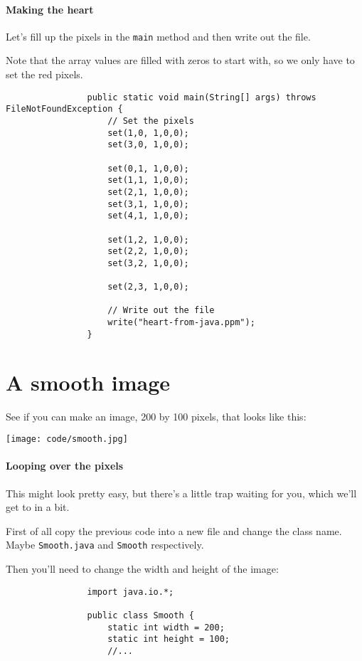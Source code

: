 \documentclass{article}
\begin{document}
        \paragraph{Making the heart}
            Let's fill up the pixels in the \texttt{main} method and then write out the file.
            
            Note that the array values are filled with zeros to start with, so we only have to set the red pixels.
            
            \begin{verbatim}
                public static void main(String[] args) throws FileNotFoundException {
                    // Set the pixels
                    set(1,0, 1,0,0);
                    set(3,0, 1,0,0);
                    
                    set(0,1, 1,0,0);
                    set(1,1, 1,0,0);
                    set(2,1, 1,0,0);
                    set(3,1, 1,0,0);
                    set(4,1, 1,0,0);
                    
                    set(1,2, 1,0,0);
                    set(2,2, 1,0,0);
                    set(3,2, 1,0,0);
                    
                    set(2,3, 1,0,0);
                    
                    // Write out the file
                    write("heart-from-java.ppm");
                }
            \end{verbatim}

    \newpage
    \section{A smooth image}
        See if you can make an image, 200 by 100 pixels, that looks like this:
        
        \texttt{[image: code/smooth.jpg]}
        
        \paragraph{Looping over the pixels}
            This might look pretty easy, but there's a little trap waiting for you, which we'll get to in a bit.
            
            First of all copy the previous code into a new file and change the class name.  Maybe \texttt{Smooth.java} and \texttt{Smooth}
            respectively.
            
            Then you'll need to change the width and height of the image:
            \begin{verbatim}
                import java.io.*;
                
                public class Smooth {
                    static int width = 200;
                    static int height = 100;
                    //...
            \end{verbatim}
            
\end{document}
